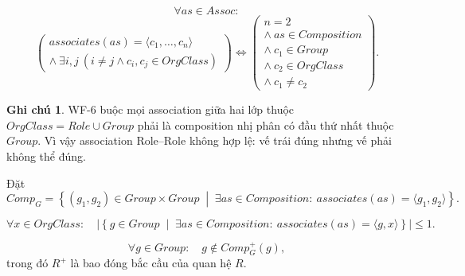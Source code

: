 \documentclass[12pt,a4paper]{article}
\theoremstyle{definition}
\newtheorem*{ghichu}{Ghi chú}
\begin{document}
\[
\forall as\in Assoc:
\]
\[
\left(
\begin{array}{c}
associates(as)=\langle c_1,\ldots,c_n\rangle
\\[1mm]
\land\
\exists i,j\ (i\neq j\land c_i,c_j\in OrgClass)
\end{array}
\right)
\Longleftrightarrow
\left(
\begin{array}{c}
n=2
\\
\land\ as\in Composition
\\
\land\ c_1\in Group
\\
\land\ c_2\in OrgClass
\\
\land\ c_1\neq c_2
\end{array}
\right).
\tag{WF-6}
\]

\begin{ghichu}
WF-6 buộc mọi association giữa hai lớp thuộc $OrgClass=Role\cup Group$ phải
là composition nhị phân có đầu thứ nhất thuộc $Group$. Vì vậy association
Role--Role không hợp lệ: vế trái đúng nhưng vế phải không thể đúng.
\end{ghichu}


Đặt
\[
Comp_G
=
\left\{
(g_1,g_2)\in Group\times Group
\;\middle|\;
\exists as\in Composition:\ associates(as)=\langle g_1,g_2\rangle
\right\}.
\]


\[
\forall x\in OrgClass:
\quad
\left|
\left\{
g\in Group
\;\middle|\;
\exists as\in Composition:\ associates(as)=\langle g,x\rangle
\right\}
\right|
\leq 1.
\tag{WF-7}
\]


\[
\forall g\in Group:
\quad
g\notin Comp_G^{+}(g),
\tag{WF-8}
\]
trong đó $R^{+}$ là bao đóng bắc cầu của quan hệ $R$.
\end{document}
